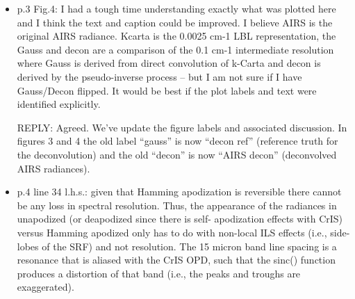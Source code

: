 \documentclass[11pt]{article}
\newcommand {\reply} {\mbox{\small REPLY}}
\begin{document}
\begin{itemize}
  \reply: We agree, medium to long term.  But in the meantime we
  have the significant overlap of AIRS and CrIS NSR data to work
  with.  The effective resolution of deconvolved AIRS does not take
  us quite to CrIS FSR for the MW and SW bands.  You can still do a
  translation but the residuals are relatively large in comparison
  with those shown in the paper.

  One solution might be to pick an intermediate resolution for CrIS,
  for example 0.6 \wn\ in the MW, that roughly corresponds to the
  AIRS resolving power, and we've added a note to that effect.  
  This is easy to do for both regular CrIS processing and our AIRS
  to CrIS translation.  In both cases we have an intermediate
  representation---sensor grid for CrIS and our deconvolution grid
  for AIRS---that can be resampled to any nominal resolution we
  like.  We've expanded the discussion of NSR and FSR at the end of
  the CrIS translation section and used this topic as a lead-in to
  the next section, translation to an idealized grating model.

\item p.3 Fig.4: I had a tough time understanding exactly what was
  plotted here and I think the text and caption could be improved.
  I believe AIRS is the original AIRS radiance. Kcarta is the 0.0025
  cm-1 LBL representation, the Gauss and decon are a comparison of
  the 0.1 cm-1 intermediate resolution where Gauss is derived from
  direct convolution of k-Carta and decon is derived by the
  pseudo-inverse process – but I am not sure if I have Gauss/Decon
  flipped. It would be best if the plot labels and text were
  identified explicitly.

  \reply: Agreed.  We've update the figure labels and associated
  discussion.  In figures 3 and 4 the old label ``gauss'' is now
  ``decon ref'' (reference truth for the deconvolution) and the old
  ``decon'' is now ``AIRS decon'' (deconvolved AIRS radiances).

\item p.4 line 34 l.h.s.: given that Hamming apodization is
  reversible there cannot be any loss in spectral resolution. Thus,
  the appearance of the radiances in unapodized (or deapodized since
  there is self- apodization effects with CrIS) versus Hamming
  apodized only has to do with non-local ILS effects (i.e.,
  side-lobes of the SRF) and not resolution. The 15 micron band line
  spacing is a resonance that is aliased with the CrIS OPD, such
  that the sinc() function produces a distortion of that band (i.e.,
  the peaks and troughs are exaggerated).


\end{itemize}
\end{document}
